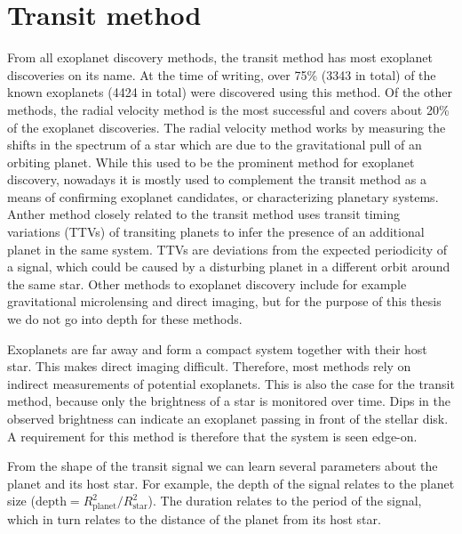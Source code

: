 
\section{Transit method}
\label{sec:transit}


From all exoplanet discovery methods, the transit method has most exoplanet discoveries on its name. At the time of writing, over 75\% (3343 in total) of the known exoplanets (4424 in total) were discovered using this method. Of the other methods, the radial velocity method is the most successful and covers about 20\% of the exoplanet discoveries. The radial velocity method works by measuring the shifts in the spectrum of a star which are due to the gravitational pull of an orbiting planet. While this used to be the prominent method for exoplanet discovery, nowadays it is mostly used to complement the transit method as a means of confirming exoplanet candidates, or characterizing planetary systems. Anther method closely related to the transit method uses transit timing variations (TTVs) of transiting planets to infer the presence of an additional planet in the same system. TTVs are deviations from the expected periodicity of a signal, which could be caused by a disturbing planet in a different orbit around the same star. Other methods to exoplanet discovery include for example gravitational microlensing and direct imaging, but for the purpose of this thesis we do not go into depth for these methods.

Exoplanets are far away and form a compact system together with their host star. This makes direct imaging difficult. Therefore, most methods rely on indirect measurements of potential exoplanets. This is also the case for the transit method, because only the brightness of a star is monitored over time. Dips in the observed brightness can indicate an exoplanet passing in front of the stellar disk. A requirement for this method is therefore that the system is seen edge-on.

From the shape of the transit signal we can learn several parameters about the planet and its host star. For example, the depth of the signal relates to the planet size ($\text{depth} = R_{\text{planet}}^2/ R_{\text{star}}^2$). The duration relates to the period of the signal, which in turn relates to the distance of the planet from its host star.



